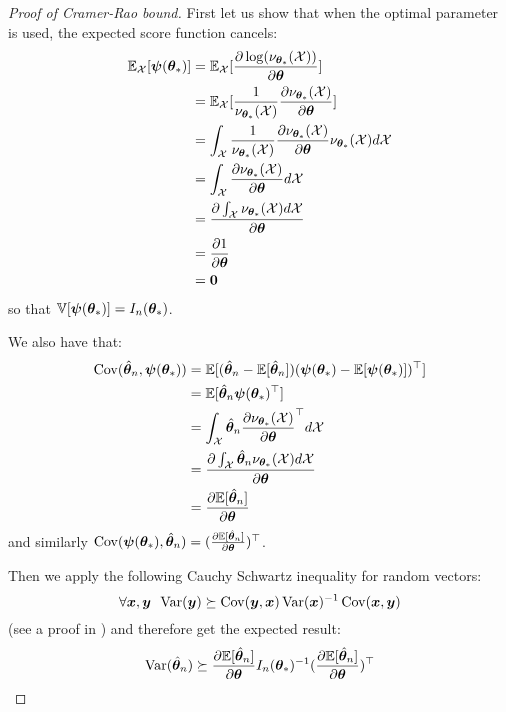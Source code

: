 \begin{proof}[Proof of Cramer-Rao bound]
  First let us show that when the optimal parameter is used, the expected score
  function cancels:
  \begin{align}
    \EE_{\Xcal}[\psib(\thetab_*)] 
    &= \EE_{\Xcal}[\partialfrac{\thetab}{\log(\nu_{\thetab_*}(\Xcal))}] \\
    &= \EE_{\Xcal}[\frac1{\nu_{\thetab_*}(\Xcal)}\partialfrac{\thetab}{\nu_{\thetab_*}(\Xcal)}] \\
    &= \int_{\Xcal} \frac1{\nu_{\thetab_*}(\Xcal)}\partialfrac{\thetab}{\nu_{\thetab_*}(\Xcal)} \nu_{\thetab_*}(\Xcal) d\Xcal \\
    &= \int_{\Xcal} \partialfrac{\thetab}{\nu_{\thetab_*}(\Xcal)} d\Xcal \\
    &= \partialfrac{\thetab}{\int_{\Xcal} \nu_{\thetab_*}(\Xcal)d\Xcal}  \\
    &= \partialfrac{\thetab}{1} \\
    &= \bzero
  \end{align}
  so that $\VV[\psib(\thetab_*)] = I_n(\thetab_*)$.

  We also have that:
  \begin{align}
    \Cov(\hat{\thetab}_n, \psib(\thetab_*)) &= \EE[ (\hat{\thetab}_n - \EE[\hat{\thetab}_n]) (\psib(\thetab_*) -  \EE[\psib(\thetab_*)])^{\top}]\\
                                           &= \EE[ \hat{\thetab}_n \psib(\thetab_*)^{\top}]\\
                                           &= \int_{\Xcal} \hat{\thetab}_n \partialfrac{\thetab}{\nu_{\thetab_*}(\Xcal)}^{\top} d\Xcal \\
                                           &= \partialfrac{\thetab}{\int_{\Xcal} \hat{\thetab}_n \nu_{\thetab_*}(\Xcal) d\Xcal} \\
                                           &= \partialfrac{\thetab}{\EE[\hat{\thetab}_n]}
  \end{align}
  and similarly $\Cov(\psib(\thetab_*), \hat{\thetab}_n) = (\partialfrac{\thetab}{\EE[\hat{\thetab}_n]})^{\top}$.

  Then we apply the following Cauchy Schwartz inequality for random vectors:
  \begin{equation}
  \forall \xb, \yb \enspace \Var(\yb) \succeq  \Cov(\yb, \xb) \Var(\xb)^{-1} \Cov(\xb, \yb)
  \end{equation}
(see a proof in \cite{tripathi1999matrix})
and therefore get the expected result:
  \begin{align}
    \Var(\hat{\thetab}_n) \succeq  \partialfrac{\thetab}{\EE[\hat{\thetab}_n]} I_n(\thetab_*)^{-1} (\partialfrac{\thetab}{\EE[\hat{\thetab}_n]})^{\top} 
  \end{align}
\end{proof}

